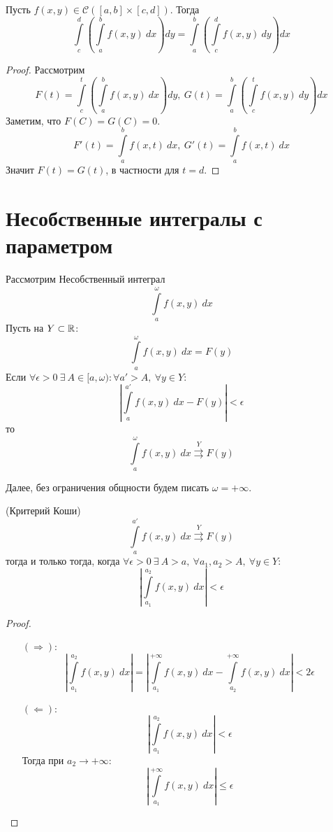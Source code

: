 \begin{theorem}
    Пусть $f(x,y)\in \mathcal{C}([a,b]\times [c,d])$. Тогда 
    \[\int\limits_{c}^{d}\left(\int\limits_{a}^{b}f(x,y)\ dx\right) dy=\int\limits_{a}^{b}\left(\int\limits_{c}^{d}f(x,y)\ dy\right) dx\]
\end{theorem}
\begin{proof}
    Рассмотрим
    \[F(t)=\int\limits_{c}^{t}\left(\int\limits_{a}^{b}f(x,y)\ dx\right) dy,\ G(t)=\int\limits_{a}^{b}\left(\int\limits_{c}^{t}f(x,y)\ dy\right)dx\]
    Заметим, что $F(C)=G(C)=0$.
    \[F'(t)=\int\limits_{a}^{b}f(x,t)\ dx,\ G'(t)=\int\limits_{a}^{b}f(x,t)\ dx\]
    Значит $F(t)=G(t)$, в частности для $t=d$.
\end{proof}
\section{Несобственные интегралы с параметром}
\begin{definition}
    Рассмотрим Несобственный интеграл 
    \[\int\limits_{a}^{\omega}f(x,y)\ dx\]
    Пусть на $Y\subset \mathbb{R}$:
    \[\int\limits_{a}^{\omega}f(x,y)\ dx=F(y)\]
    Если $\forall \epsilon>0\ \exists\ A\in [a,\omega): \forall a'>A,\ \forall y\in Y:$
    \[\left|\int\limits_{a}^{a'}f(x,y)\ dx-F(y)\right|<\epsilon\]
    то
    \[\int\limits_{a}^{\omega}f(x,y)\ dx\overset{Y}{\rightrightarrows} F(y)\]
\end{definition}
Далее, без ограничения общности будем писать $\omega=+\infty$.
\begin{theorem} (Критерий Коши)\\
    \[\int\limits_{a}^{a'}f(x,y)\ dx\overset{Y}{\rightrightarrows} F(y)\]
    тогда и только тогда, когда $\forall \epsilon>0\ \exists\ A>a,\ \forall a_1,a_2>A,\ \forall y\in Y$:
    \[\left|\int\limits_{a_1}^{a_2}f(x,y)\ dx\right|<\epsilon\]
\end{theorem}
\begin{proof}\tab
    \begin{itemize}
        \item[$(\Rightarrow)$:]
        \[\left|\int\limits_{a_1}^{a_2}f(x,y)\ dx\right|=\left|\int\limits_{a_1}^{+\infty}f(x,y)\ dx-\int\limits_{a_2}^{+\infty}f(x,y)\ dx\right|< 2\epsilon\]
        \item[$(\Leftarrow)$:]
        \[\left|\int\limits_{a_1}^{a_2}f(x,y)\ dx\right|<\epsilon\]
        Тогда при $a_2\to +\infty$:
        \[\left|\int\limits_{a_1}^{+\infty}f(x,y)\ dx\right|\leq \epsilon\]
    \end{itemize}
\end{proof}

